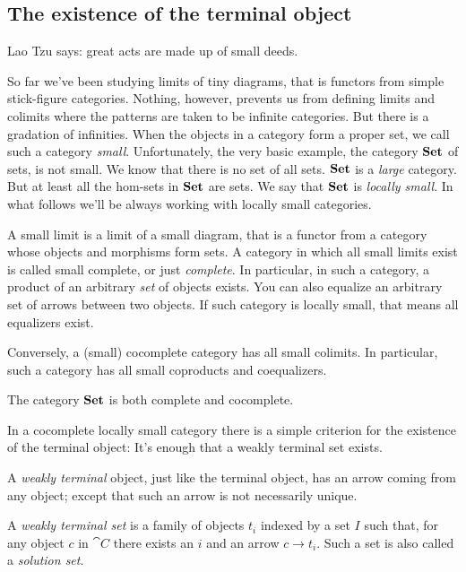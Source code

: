 \documentclass[DaoFP]{subfiles}
\begin{document}
\subsection{The existence of the terminal object}

Lao Tzu says: great acts are made up of small deeds.

So far we've been studying limits of tiny diagrams, that is functors from simple stick-figure categories. Nothing, however, prevents us from defining limits and colimits where the patterns are taken to be infinite categories. But there is a gradation of infinities. When the objects in a category form a proper set, we call such a category  \emph{small}. Unfortunately, the very basic example, the category $\mathbf{Set}$ of sets, is not small. We know that there is no set of all sets. $\mathbf{Set}$ is a \emph{large} category. But at least all the hom-sets in $\mathbf{Set}$ are sets. We say that $\mathbf{Set}$ is \emph{locally small}. In what follows we'll be always working with locally small categories.

A small limit is a limit of a small diagram, that is a functor from a category whose objects and morphisms form sets. A category in which all small limits exist is called small complete, or just \emph{complete}. In particular, in such a category, a product of an arbitrary \emph{set} of objects exists. You can also equalize an arbitrary set of arrows between two objects. If such category is locally small, that means all equalizers exist.

Conversely, a (small) cocomplete category has all small colimits. In particular, such a category has all small coproducts and coequalizers.

The category $\mathbf{Set}$ is both complete and cocomplete. 


In a cocomplete locally small category there is a simple criterion for the existence of the terminal object: It's enough that a weakly terminal set exists. 

A \emph{weakly terminal} object, just like the terminal object, has an arrow coming from any object; except that such an arrow is not necessarily unique. 

A \emph{weakly terminal set} is a family of objects $t_i$ indexed by a set $I$ such that, for any object $c$ in $\cat C$ there exists an $i$ and an arrow $c \to t_i$. Such a set is also called a \emph{solution set}.
\end{document}
